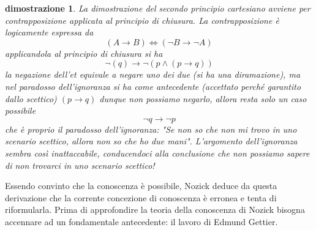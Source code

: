 \documentclass[10pt,a4paper]{article}
\newtheorem{dimostrazione}{dimostrazione}
\begin{document}
\begin{dimostrazione}
	La dimostrazione del secondo principio cartesiano avviene per contrapposizione applicata al principio di chiusura. La contrapposizione è logicamente espressa da
	\[(A\rightarrow B) \Leftrightarrow (\neg B \rightarrow \neg A)\]
	applicandola al principio di chiusura si ha
	\[\neg(q) \rightarrow \neg(p \wedge (p\rightarrow q))\]
	la negazione dell'et equivale a negare uno dei due (si ha una diramazione), ma nel paradosso dell'ignoranza si ha come antecedente (accettato perché garantito dallo scettico) \((p\rightarrow q)\) dunque non possiamo negarlo, allora resta solo un caso possibile
	\[\neg q \rightarrow \neg p\]
	che è proprio il paradosso dell'ignoranza: "Se non so che non mi trovo in uno scenario scettico, allora non so che ho due mani". L'argomento dell'ignoranza sembra così inattaccabile, conducendoci alla conclusione che non possiamo sapere di non trovarci in uno scenario scettico! 
\end{dimostrazione}
Essendo convinto che la conoscenza è possibile, Nozick deduce da questa derivazione che la corrente concezione di conoscenza è erronea e tenta di riformularla. Prima di approfondire la teoria della conoscenza di Nozick bisogna accennare ad un fondamentale antecedente: il lavoro di Edmund Gettier.

\newpage
\end{document}

